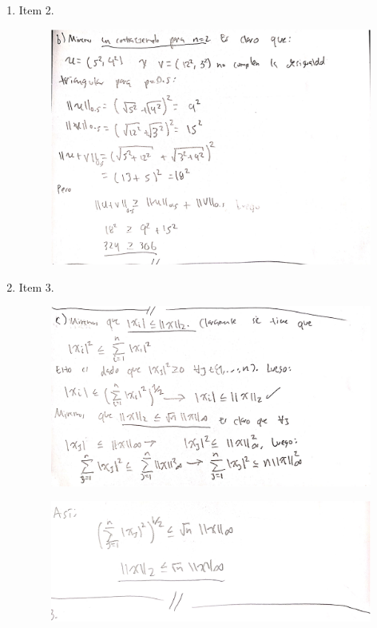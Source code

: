 \documentclass[fleqn]{article}
\begin{document}
\begin{enumerate}
\begin{enumerate}
\begin{figure}[H]
           \end{figure}
           \newpage
         \item Item 2.
           \begin{figure}[H]
             \centering \includegraphics[scale=.5]{figs/2b}
           \end{figure}
         \item Item 3.
           \begin{figure}[H]
             \centering \includegraphics[scale=.5]{figs/2c1}
         \end{figure}
           \begin{figure}[H]
             \centering \includegraphics[scale=.4]{figs/2c2}
         \end{figure}
       \end{enumerate}


\end{enumerate}
\end{document}

